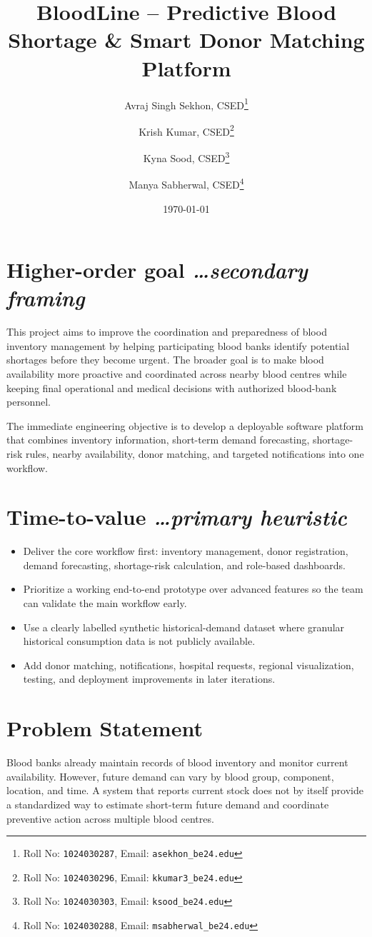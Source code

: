 \documentclass[11pt,a4paper]{article}
\title{BloodLine -- Predictive Blood Shortage \& Smart Donor Matching Platform}
\author{
Avraj Singh Sekhon, CSED\thanks{Roll No: \texttt{1024030287}, Email: \texttt{asekhon\_be24\@thapar.edu}}
\and
Krish Kumar, CSED\thanks{Roll No: \texttt{1024030296}, Email: \texttt{kkumar3\_be24\@thapar.edu}}
\and
Kyna Sood, CSED\thanks{Roll No: \texttt{1024030303}, Email: \texttt{ksood\_be24\@thapar.edu}}
\and
Manya Sabherwal, CSED\thanks{Roll No: \texttt{1024030288}, Email: \texttt{msabherwal\_be24\@thapar.edu}}
}
\date{\today}
\newcommand{\BvrHint}[1]{{\normalfont\normalsize\itshape\hfill #1}}
\begin{document}
\maketitle

\section{Higher-order goal \BvrHint{\ldots secondary framing}}
This project aims to improve the coordination and preparedness of blood inventory management by helping participating blood banks identify potential shortages before they become urgent. The broader goal is to make blood availability more proactive and coordinated across nearby blood centres while keeping final operational and medical decisions with authorized blood-bank personnel.

The immediate engineering objective is to develop a deployable software platform that combines inventory information, short-term demand forecasting, shortage-risk rules, nearby availability, donor matching, and targeted notifications into one workflow.

\section{Time-to-value \BvrHint{\ldots primary heuristic}}
\begin{itemize}[leftmargin=0.7cm]
\item Deliver the core workflow first: inventory management, donor registration, demand forecasting, shortage-risk calculation, and role-based dashboards.
\item Prioritize a working end-to-end prototype over advanced features so the team can validate the main workflow early.
\item Use a clearly labelled synthetic historical-demand dataset where granular historical consumption data is not publicly available.
\item Add donor matching, notifications, hospital requests, regional visualization, testing, and deployment improvements in later iterations.
\end{itemize}

\section{Problem Statement}
Blood banks already maintain records of blood inventory and monitor current availability. However, future demand can vary by blood group, component, location, and time. A system that reports current stock does not by itself provide a standardized way to estimate short-term future demand and coordinate preventive action across multiple blood centres.
\end{document}
